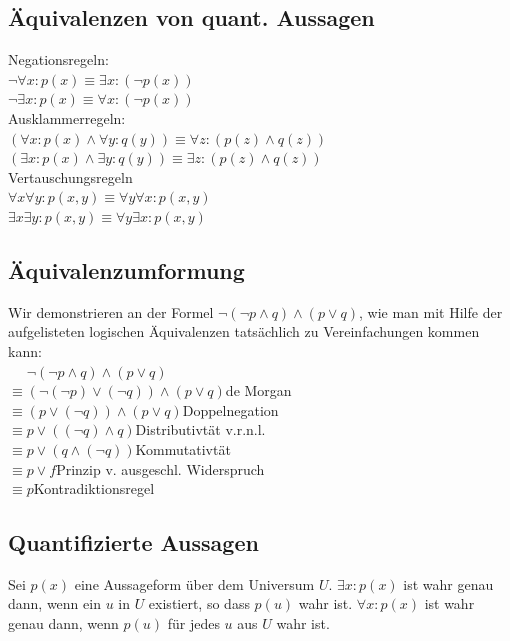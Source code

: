 \subsection*{Äquivalenzen von quant. Aussagen}
Negationsregeln:\\
$\neg\forall x:p(x)\equiv\exists x:(\neg p(x))$\\
$\neg\exists x:p(x)\equiv\forall x:(\neg p(x))$\\
Ausklammerregeln:\\
$(\forall x:p(x)\wedge\forall y:q(y))\equiv\forall z:(p(z)\wedge q(z))$\\
$(\exists x:p(x)\wedge\exists y:q(y))\equiv\exists z:(p(z)\wedge q(z))$\\
Vertauschungsregeln\\
$\forall x\forall y:p(x,y)\equiv\forall y\forall x:p(x,y)$\\
$\exists x\exists y:p(x,y)\equiv\forall y\exists x:p(x,y)$
\subsection*{Äquivalenzumformung}
Wir demonstrieren an der Formel $\neg (\neg p \wedge q) \wedge (p \vee q)$, wie man mit Hilfe der
aufgelisteten logischen Äquivalenzen tatsächlich zu Vereinfachungen kommen kann:\\
$\phantom{{}\equiv{}} \neg (\neg p \wedge q) \wedge (p \vee q)$\\
$\equiv (\neg (\neg p) \vee (\neg q)) \wedge (p \vee q)$\hfill de Morgan\\
$\equiv (p \vee (\neg q)) \wedge (p \vee q)$\hfill Doppelnegation\\
$\equiv p \vee ((\neg q) \wedge q)$\hfill Distributivtät v.r.n.l.\\
$\equiv p \vee (q \wedge (\neg q))$\hfill Kommutativtät\\
$\equiv p \vee f$\hfill Prinzip v. ausgeschl. Widerspruch\\
$\equiv p$\hfill Kontradiktionsregel
\subsection*{Quantifizierte Aussagen}
Sei $p(x)$ eine Aussageform über dem Universum $U$.
$\exists x : p(x)$ ist wahr genau dann, wenn ein $u$ in $U$ existiert, so dass $p(u)$ wahr ist.
$\forall x : p(x)$ ist wahr genau dann, wenn $p(u)$ für jedes $u$ aus $U$ wahr ist.